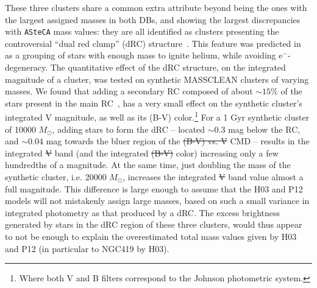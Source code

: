 \documentclass[draft]{aa}
\providecommand{\DIFaddtex}[1]{{\protect\color{blue}\uwave{#1}}} %
\providecommand{\DIFdeltex}[1]{{\protect\color{red}\sout{#1}}}                      %
\providecommand{\DIFaddbegin}{} %
\providecommand{\DIFaddend}{} %
\providecommand{\DIFdelbegin}{} %
\providecommand{\DIFdelend}{} %
\providecommand{\DIFadd}[1]{\texorpdfstring{\DIFaddtex{#1}}{#1}} %
\providecommand{\DIFdel}[1]{\texorpdfstring{\DIFdeltex{#1}}{}} %
\begin{document}
These three clusters share a common extra attribute beyond being the ones with
the largest assigned masses in both DBs, and showing the largest discrepancies
with \texttt{ASteCA} mass values: they are all identified as clusters
presenting the controversial ``dual red clump'' (dRC)
structure~\citep{Girardi_2009}.
This feature was predicted in~\cite{Girardi_1998} as a grouping of stars with
enough mass to ignite helium, while avoiding e$^-$-degeneracy.
%
%
%
The quantitative effect of the dRC structure, on the integrated magnitude of a
cluster, was tested on synthetic MASSCLEAN clusters of varying masses. We found
that adding a secondary RC composed of about ${\sim}15\%$ of the stars present
in the main RC~\citep[the approximate value found for NGC419 in][]
{Girardi_2009}, has a very small effect on the synthetic cluster's integrated V
magnitude, as well as its (B-V) color.\footnote{Where both V and B filters
correspond to the Johnson photometric system.}
%
For a 1 Gyr synthetic cluster of 10000 $M_{\odot}$, adding stars
to form the dRC -- located ${\sim}0.3$ mag below the RC, and
${\sim}0.04$ mag towards the bluer region of the \DIFdelbegin \DIFdel{(B-V) vs. V }\DIFdelend \DIFaddbegin \DIFadd{$(B-V)$ vs. $V$ }\DIFaddend CMD -- results
in the integrated \DIFdelbegin \DIFdel{V }\DIFdelend \DIFaddbegin \DIFadd{$V$ }\DIFaddend band (and the integrated \DIFdelbegin \DIFdel{(B-V) }\DIFdelend \DIFaddbegin \DIFadd{$(B-V)$ }\DIFaddend color) increasing only
a few hundredths of a magnitude.
At the same time, just doubling the mass of the synthetic cluster, i.e.
20000 $M_{\odot}$, increases the integrated \DIFdelbegin \DIFdel{V }\DIFdelend \DIFaddbegin \DIFadd{$V$ }\DIFaddend band value almost a full
magnitude. This difference is large enough to assume that the H03 and P12
models will not mistakenly assign large masses, based on such a small variance
in integrated photometry as that produced by a dRC.\@
%
The excess brightness generated by stars in the dRC region of these three
clusters, would thus appear to not be enough to explain the overestimated total
mass values given by H03 and P12 (in particular to NGC419 by H03).
\end{document}
